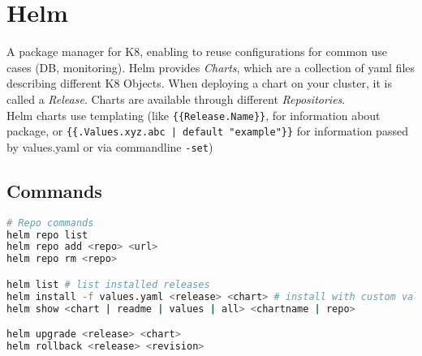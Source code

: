 \section{Helm}
A package manager for K8, enabling to reuse configurations for common use cases (DB, monitoring). Helm provides \textit{Charts}, which are a collection of yaml files describing different K8 Objects. When deploying a chart on your cluster, it is called a \textit{Release}. Charts are available through different \textit{Repositories}. \\
Helm charts use templating (like \texttt{\{\{Release.Name\}\}}, for information about package, or \texttt{\{\{.Values.xyz.abc | default "example"\}\}} for information passed by values.yaml or via commandline \texttt{-set})

\subsection{Commands}

\begin{lstlisting}[language=sh]
# Repo commands
helm repo list
helm repo add <repo> <url>
helm repo rm <repo>

helm list # list installed releases
helm install -f values.yaml <release> <chart> # install with custom values
helm show <chart | readme | values | all> <chartname | repo>

helm upgrade <release> <chart>
helm rollback <release> <revision>

\end{lstlisting}
